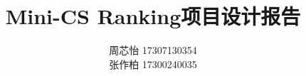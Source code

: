 \documentclass[12pt]{article} %
\title{\textbf{Mini-CS Ranking项目设计报告}}
\author{周芯怡 17307130354 \\张作柏 17300240035}
\begin{document}
\begin{sloppypar}
\maketitle

\pagestyle{fancy}
\lhead{\textbf{{\thetitle}}}
\rhead{\textbf{\nouppercase{\firstleftmark}}}
\cfoot{\thepage}

\thispagestyle{empty}
\tableofcontents
\thispagestyle{empty}
\clearpage

\setcounter{page}{1}









\end{sloppypar}
\end{document}

